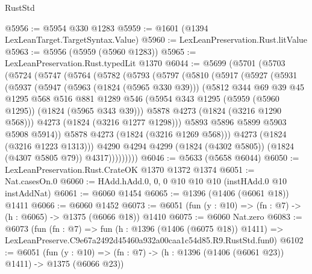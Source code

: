 \begin{lexlean}{RustStd}
\begin{coremodule}
@5956 := @5954 @330 @1283
@5959 := @1601 (@1394 LexLeanTarget.TargetSyntax.Value)
@5960 := LexLeanPreservation.Rust.litValue
@5963 := @5956 (@5959 (@5960 @1283))
@5965 := LexLeanPreservation.Rust.typedLit @1370
@6044 := @5699
    (@5701
      (@5703
        (@5724
          (@5747
            (@5764
              (@5782
                (@5793
                  (@5797
                    (@5810
                      (@5917
                        (@5927
                          (@5931
                            (@5937
                              (@5947
                                (@5963 (@1824 (@5965 @330 @39)))
                                (@5812
                                  @344
                                  @69
                                  @39
                                  @45
                                  @1295
                                  @568
                                  @516
                                  @881
                                  @1289
                                  @546
                                  (@5954 @343 @1295 (@5959 (@5960 @1295)) (@1824 (@5965 @343 @39)))
                                  @5878
                                  @4273
                                  (@1824 (@3216 @1290 @568)))
                                @4273
                                (@1824 (@3216 @1277 @1298)))
                              @5893
                              @5896
                              @5899
                              @5903
                              @5908
                              @5914))
                          @5878
                          @4273
                          (@1824 (@3216 @1269 @568)))
                        @4273
                        (@1824 (@3216 @1223 @1313)))
                      @4290
                      @4294
                      @4299
                      (@1824 (@4302 @5805))
                      (@1824 (@4307 @5805 @79))
                      @4317)))))))))
@6046 := @5633 (@5658 @6044)
@6050 := LexLeanPreservation.Rust.CrateOK @1370 @1372 @1374
@6051 := Nat.casesOn.{0}
@6060 := HAdd.hAdd.{0, 0, 0} @10 @10 @10 (instHAdd.{0} @10 instAddNat)
@6061 := @6060 @1454
@6065 := @1396 (@1406 (@6061 @18)) @1411
@6066 := @6060 @1452
@6073 := @6051 (fun (y : @10) => (fn : @7) -> (h : @6065) -> @1375 (@6066 @18)) @1410
@6075 := @6060 Nat.zero
@6083 := @6073
    (fun (fn : @7) =>
    fun (h : @1396 (@1406 (@6075 @18)) @1411) =>
    LexLeanPreserve.C9e67a2492d45460a932a00caa1c54d85.R9.RustStd.fun0)
@6102 := @6051
    (fun (y : @10) => (fn : @7) -> (h : @1396 (@1406 (@6061 @23)) @1411) -> @1375 (@6066 @23))

\end{coremodule}
\end{lexlean}
